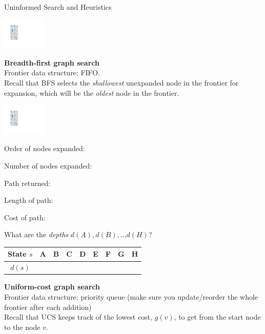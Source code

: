 \begin{problem}{Uninformed Search and Heuristics}
\begin{question}
\begin{center}
\includegraphics[width=0.15\textwidth]{figures/simple_nodir.pdf}
\label{fig:montezuma}
\end{center}

\newpage
\begin{subquestion}[8]
\textbf{Breadth-first graph search}\\
Frontier data structure: FIFO.\\
Recall that BFS selects the {\em shallowest} unexpanded node in the frontier for expansion, which will be the {\em oldest} node in the frontier.\\

\begin{center}
\includegraphics[width=0.15\textwidth]{figures/simple_nodir.pdf}
\label{fig:montezuma}
\end{center}



Order of nodes expanded:

Number of nodes expanded: 

Path returned: 

Length of path: 

Cost of path: 

What are the {\em depths} $d(A), d(B), \ldots d(H)$?

\def\arraystretch{1.5}
\setlength\tabcolsep{15pt}
\begin{center}
\begin{tabular}{|c|c|c|c|c|c|c|c|c|}
    \hline
      State $s$ & A & B & C & D & E & F & G & H  \\
    \hline
      $d(s)$ &  &  &  &  &  &  &  &  \\
    \hline
\end{tabular}
\end{center}
\end{subquestion}

\newpage
\begin{subquestion}[8]
\textbf{Uniform-cost graph search}\\
Frontier data structure: priority queue (make sure you update/reorder the whole frontier after each addition)\\
Recall that UCS keeps track of the lowest cost, $g(v)$, to get from the start node to the node $v$.\\


\end{subquestion}
\end{question}
\end{problem}
